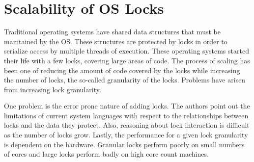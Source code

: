 \documentclass[12pt]{article}
\begin{document}
\section*{Scalability of OS Locks}
Traditional operating systems have shared data structures that must be
maintained by the OS.  These structures are protected by locks in
order to serialize access by multiple threads of execution.  These
operating systems started their life with a few locks, covering large
areas of code.  The process of scaling has been one of reducing the
amount of code covered by the locks while increasing the number of
locks, the so-called granularity of the locks.  Problems have
arisen from increasing lock granularity.

One problem is the error prone nature of adding locks.  The authors
point out the limitations of current system languages with respect to
the relationships between locks and the data they protect.  Also,
reasoning about lock interaction is difficult as the number of locks
grow.  Lastly, the performance for a given lock granularity is
dependent on the hardware.  Granular locks perform poorly on small
numbers of cores and large locks perform badly on high core count
machines.




\end{document}
